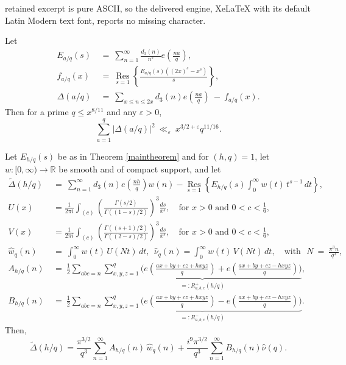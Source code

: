 \documentclass[10pt,a4paper]{amsart}
\begin{document}
retained excerpt is pure ASCII, so the delivered engine, XeLaTeX with its default Latin Modern text font, reports no missing character.
\begin{theorem}\label{maintheorem}
    Let 
    \begin{align*}
        E_{a/q}(s)\ &=\ \sum_{n=1}^{\infty} \frac{d_3(n)}{n^s} e\left( \frac{na}{q} \right), \\
        f_{a/q}(x)\ &=\ \underset{s=1}{\operatorname{Res}} \left\{ \frac{E_{a/q}(s) \left( (2x)^s - x^s \right)}{s} \right\}, \\
        \Delta(a/q)\ &=\ \sum_{x \leq n \leq 2x} d_3(n) e\left( \frac{na}{q} \right)\ -\ f_{a/q}(x).
    \end{align*}
    Then for a prime $q \le x^{8/11}$ and any $\varepsilon > 0$,
    \begin{equation*}
        \sum_{a=1}^q |\Delta(a/q)|^2\ \ll_{\varepsilon}\ x^{3/2+\varepsilon} q^{11/16}.
    \end{equation*}
\end{theorem}

\begin{lemma}\label{lemma1}
    Let $E_{h/q}(s)$ be as in Theorem \ref{maintheorem} and for $(h, q) = 1$, let $w: [0,\infty) \rightarrow \mathbb{R}$ be smooth and of compact support, and let
\begin{align*}
     \tilde{\Delta}(h/q) \ &=\  \sum_{n=1}^{\infty} d_3(n) e\left( \frac{nh}{q} \right) w(n) - \underset{s=1}{\operatorname{Res}} \left\{ E_{h/q}(s) \int_0^\infty w(t)\, t^{s-1} \,dt \right\},\\
      U(x)&=\frac{1}{2\pi i} \int_{(c)}\left( \frac{\Gamma(s/2)}{\Gamma((1 - s)/2)} \right)^3 \frac{ds}{x^s}, \quad \text{for } x > 0 \text{ and } 0 < c < \frac{1}{6},\\
      V(x)&= \frac{1}{2\pi i} \int_{(c)}\left(\frac{\Gamma((s+1)/2)}{\Gamma((2-s)/2)}\right)^3 \frac{ds}{x^s}, \quad \text{for } x>0 \text{ and } 0 <c < \frac{1}{6}, \\
      \hat{w}_q(n)\  &=\  \int_0^\infty w(t)\, U(Nt)\, dt, \ \ \hat{\nu}_q(n) =\int_0^\infty w(t)\, V(Nt)\, dt,\quad \text{with}\ \ \  N \ =\  \frac{\pi^3 n}{q^3},\\
      A_{h/q}(n) \ &=\  \frac{1}{2} \sum_{abc = n} \underbrace{\sum_{x,y,z=1}^q \Biggl(e\left( \frac{ax+by+cz+hxyz}{q} \right) + e\left( \frac{ax+by+cz-hxyz}{q} \right)\Biggr)}_{=: R^{+}_{a,b,c}(h/q)},\\
       B_{h/q}(n) \ &=\  \frac{1}{2} \sum_{abc = n} \underbrace{\sum_{x,y,z=1}^q \Biggl(e\left( \frac{ax+by+cz+hxyz}{q} \right) - e\left( \frac{ax+by+cz-hxyz}{q} \right)\Biggr)}_{=:R^{-}_{a,b,c}(h/q)}.
\end{align*}
Then,
    \begin{equation*}
        \tilde{\Delta}(h/q) = \frac{\pi^{3/2}}{q^3} \sum_{n=1}^{\infty} A_{h/q}(n)\, \hat{w}_q(n) + \frac{i^9 \pi^{3/2}}{q^3} \sum_{n=1}^{\infty} B_{h/q}(n)\hat{\nu}(q).
    \end{equation*}
\end{lemma}
\end{document}
